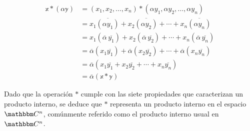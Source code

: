 \begin{example}
\begin{enumerate}[label=\roman*)]
        \begin{align*}
            \mathbb{x} * (\alpha \mathbb{y}) & = (x_1, x_2, \dots, x_n) * (\alpha y_1, \alpha y_2, \dots, \alpha y_n) \\
            & = x_1 \overline{\left( \alpha y_1 \right)} + x_2 \overline{\left( \alpha y_2 \right)} + \cdots + x_n \overline{\left( \alpha y_n \right)} \\
            & = x_1 \left( \overline{\alpha} \, \overline{y_1} \right) + x_2 \left( \overline{\alpha} \, \overline{y_2} \right) + \cdots + x_n \left( \overline{\alpha} \, \overline{y_n} \right) \\
            & = \overline{\alpha} \left( x_1 \overline{y_1} \right) + \overline{\alpha} \left( x_2 \overline{y_2} \right) + \cdots + \overline{\alpha} \left( x_n \overline{y_n} \right) \\
            & = \overline{\alpha} \left( x_1\overline{y_1} + x_2\overline{y_2} + \cdots + x_n\overline{y_n} \right) \\
            & = \overline{\alpha} (\mathbb{x} * \mathbb{y})
        \end{align*}
    \end{enumerate}
    Dado que la operación $*$ cumple con las siete propiedades que caracterizan un producto interno, se deduce que $*$ representa un producto interno en el espacio $\CC[n]$, comúnmente referido como el producto interno usual en $\CC[n]$.
\end{example}

\newpage

